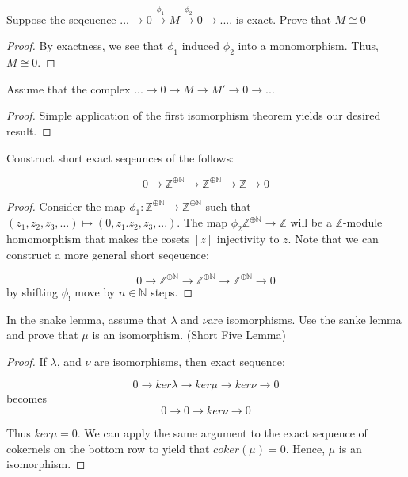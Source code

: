 \documentclass[Aluffi.tex]{subfiles}
\begin{document}
\begin{problem}
Suppose the seqeuence $... \rightarrow 0 \xrightarrow{\phi_1}  M  \xrightarrow{\phi_2} 0 \rightarrow ....$
is exact. Prove that $M\cong 0$
\end{problem}

\begin{proof}
By exactness, we see that $\phi_1$ induced $\phi_2$ into a monomorphism. Thus, $M \cong 0$. 
\end{proof}

\begin{problem}
Assume that the complex $... \rightarrow 0 \rightarrow M \rightarrow M' \rightarrow 0 \rightarrow ...$
\end{problem}

\begin{proof}
Simple application of the first isomorphism theorem yields our desired result.
\end{proof}


\begin{problem}
Construct short exact seqeunces of the follows:

$$ 0 \rightarrow \mathbb{Z}^{\oplus \mathbb{N}} \rightarrow  \mathbb{Z}^{\oplus \mathbb{N}} \rightarrow \mathbb{Z} \rightarrow 0 $$
\end{problem}

\begin{proof}
Consider the map $\phi_1: \mathbb{Z}^{\oplus \mathbb{N}} \rightarrow \mathbb{Z}^{\oplus \mathbb{N}}$ such that $(z_1,z_2,z_3,...) \mapsto (0,z_1.z_2,z_3,...)$. The map $\phi_2 \mathbb{Z}^{\oplus \mathbb{N}} \rightarrow \mathbb{Z}$ will be a $\mathbb{Z}$-module homomorphism that makes the cosets $[z]$ injectivity to $z$. Note that we can construct a more general short seqeuence:

$$ 0 \rightarrow \mathbb{Z}^{\oplus \mathbb{N}} \rightarrow  \mathbb{Z}^{\oplus \mathbb{N}} \rightarrow \mathbb{Z}^{\oplus \mathbb{N}} \rightarrow  0$$ by shifting $\phi_!$ move by $n \in \mathbb{N}$ steps.  
\end{proof}


\begin{problem}
In the snake lemma, assume that $\lambda$ and $\nu$are isomorphisms. Use the sanke lemma and prove that $\mu$ is an isomorphism. (Short Five Lemma)
\end{problem}

\begin{proof}
If $\lambda$, and $\nu$ are isomorphisms, then exact sequence: 

$$0 \rightarrow ker\lambda \rightarrow ker\mu \rightarrow ker \nu \rightarrow 0 $$ becomes
$$ 0 \rightarrow 0 \rightarrow ker \nu \rightarrow 0  $$

Thus $ker \mu = 0$. We can apply the same argument to the exact sequence of cokernels on the bottom row to yield that $coker (\mu) = 0$. Hence, $\mu$ is an isomorphism.
\end{proof}
\end{document}
